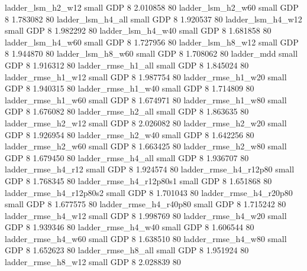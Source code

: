        ladder_lsm_h2_w12      small      GDP                 8 2.010858 80
       ladder_lsm_h2_w60      small      GDP                 8 1.783082 80
       ladder_lsm_h4_all      small      GDP                 8 1.920537 80
       ladder_lsm_h4_w12      small      GDP                 8 1.982292 80
       ladder_lsm_h4_w40      small      GDP                 8 1.681858 80
       ladder_lsm_h4_w60      small      GDP                 8 1.727956 80
       ladder_lsm_h8_w12      small      GDP                 8 1.944870 80
       ladder_lsm_h8_w60      small      GDP                 8 1.708062 80
              ladder_mdd      small      GDP                 8 1.916312 80
      ladder_rmse_h1_all      small      GDP                 8 1.845024 80
      ladder_rmse_h1_w12      small      GDP                 8 1.987754 80
      ladder_rmse_h1_w20      small      GDP                 8 1.940315 80
      ladder_rmse_h1_w40      small      GDP                 8 1.714809 80
      ladder_rmse_h1_w60      small      GDP                 8 1.674971 80
      ladder_rmse_h1_w80      small      GDP                 8 1.676082 80
      ladder_rmse_h2_all      small      GDP                 8 1.863635 80
      ladder_rmse_h2_w12      small      GDP                 8 2.026082 80
      ladder_rmse_h2_w20      small      GDP                 8 1.926954 80
      ladder_rmse_h2_w40      small      GDP                 8 1.642256 80
      ladder_rmse_h2_w60      small      GDP                 8 1.663425 80
      ladder_rmse_h2_w80      small      GDP                 8 1.679450 80
      ladder_rmse_h4_all      small      GDP                 8 1.936707 80
      ladder_rmse_h4_r12      small      GDP                 8 1.924574 80
   ladder_rmse_h4_r12p80      small      GDP                 8 1.768345 80
 ladder_rmse_h4_r12p80s1      small      GDP                 8 1.651868 80
 ladder_rmse_h4_r12p80s2      small      GDP                 8 1.701043 80
   ladder_rmse_h4_r20p80      small      GDP                 8 1.677575 80
   ladder_rmse_h4_r40p80      small      GDP                 8 1.715242 80
      ladder_rmse_h4_w12      small      GDP                 8 1.998769 80
      ladder_rmse_h4_w20      small      GDP                 8 1.939346 80
      ladder_rmse_h4_w40      small      GDP                 8 1.606544 80
      ladder_rmse_h4_w60      small      GDP                 8 1.638510 80
      ladder_rmse_h4_w80      small      GDP                 8 1.652623 80
      ladder_rmse_h8_all      small      GDP                 8 1.951924 80
      ladder_rmse_h8_w12      small      GDP                 8 2.028839 80

